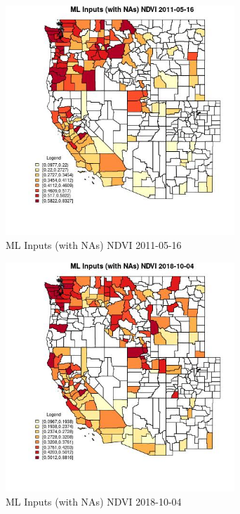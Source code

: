 \begin{figure} 
\centering  
\includegraphics[width=0.77\textwidth]{Code_Outputs/Report_ML_input_PM25_Step4_part_f_de_duplicated_aveswNAs_CountyNDVIMean2011-05-16.jpg} 
\caption{\label{fig:Report_ML_input_PM25_Step4_part_f_de_duplicated_aveswNAsCountyNDVIMean2011-05-16}ML Inputs (with NAs) NDVI 2011-05-16} 
\end{figure} 
 

\begin{figure} 
\centering  
\includegraphics[width=0.77\textwidth]{Code_Outputs/Report_ML_input_PM25_Step4_part_f_de_duplicated_aveswNAs_CountyNDVIMean2018-10-04.jpg} 
\caption{\label{fig:Report_ML_input_PM25_Step4_part_f_de_duplicated_aveswNAsCountyNDVIMean2018-10-04}ML Inputs (with NAs) NDVI 2018-10-04} 
\end{figure} 
 

